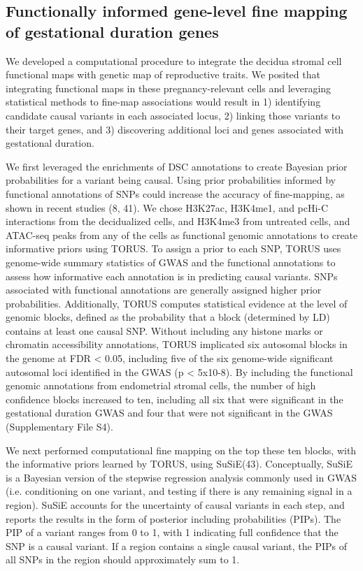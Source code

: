 \subsection{Functionally informed gene-level fine mapping of gestational duration genes}

We developed a computational procedure to integrate the decidua stromal cell functional maps with genetic map of reproductive traits.
We posited that integrating functional maps in these pregnancy-relevant cells and leveraging statistical methods to fine-map associations
would result in 1) identifying candidate causal variants in each associated locus, 2) linking those variants to their target genes, and
3) discovering additional loci and genes associated with gestational duration. 

We first leveraged the enrichments of DSC annotations to create Bayesian prior probabilities for a variant being causal. Using prior probabilities informed by functional annotations of SNPs could increase the accuracy of fine-mapping, as shown in recent studies (8, 41). We chose H3K27ac, H3K4me1, and pcHi-C interactions from the decidualized cells, and H3K4me3 from untreated cells, and ATAC-seq peaks from any of the cells as functional genomic annotations to create informative priors using TORUS\cite{torus}. To assign a prior to each SNP, TORUS uses genome-wide summary statistics of GWAS and the functional annotations to assess how informative each annotation is in predicting causal variants. SNPs associated with functional annotations are generally assigned higher prior probabilities. Additionally, TORUS computes statistical evidence at the level of genomic blocks, defined as the probability that a block (determined by LD) contains at least one causal SNP. Without including any histone marks or chromatin accessibility annotations, TORUS implicated six autosomal blocks in the genome at FDR < 0.05, including five of the six genome-wide significant autosomal loci identified in the GWAS (p < 5x10-8).
By including the functional genomic annotations from endometrial stromal cells, the number of high confidence blocks increased to ten, including all six that were significant in the gestational duration GWAS and four that were not significant in the GWAS (Supplementary File S4).  

We next performed computational fine mapping on the top these ten blocks, with the informative priors learned by TORUS, using SuSiE(43). Conceptually, SuSiE is a Bayesian version of the stepwise regression analysis commonly used in GWAS (i.e. conditioning on one variant, and testing if there is any remaining signal in a region). SuSiE accounts for the uncertainty of causal variants in each step, and reports the results in the form of posterior including probabilities (PIPs). The PIP of a variant ranges from 0 to 1, with 1 indicating full confidence that the SNP is a causal variant. If a region contains a single causal variant, the PIPs of all SNPs in the region should approximately sum to 1.  

